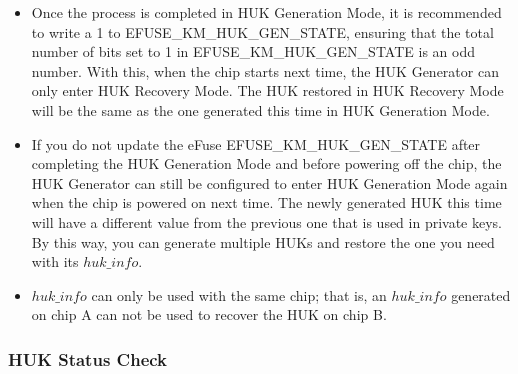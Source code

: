 \documentclass[main\_\_EN.tex]{subfiles}
\begin{document}
\vspace{-0.5em}
\begin{tiplisting}
\vspace{-2em}
\begin{itemize}
    \item Once the process is completed in HUK Generation Mode, it is recommended to write a 1 to EFUSE\_KM\_HUK\_GEN\_STATE, ensuring that the total number of bits set to 1 in EFUSE\_KM\_HUK\_GEN\_STATE is an odd number. With this, when the chip starts next time, the HUK Generator can only enter HUK Recovery Mode. The HUK restored in HUK Recovery Mode will be the same as the one generated this time in HUK Generation Mode.
    \item If you do not update the eFuse EFUSE\_KM\_HUK\_GEN\_STATE after completing the HUK Generation Mode and before powering off the chip, the HUK Generator can still be configured to enter HUK Generation Mode again when the chip is powered on next time. The newly generated HUK this time will have a different value from the previous one that is used in private keys. By this way, you can generate multiple HUKs and restore the one you need with its \hyperref[para:hukinfo]{\begin{math}huk\_info\end{math}}.
    \item \hyperref[para:hukinfo]{\begin{math}huk\_info\end{math}} can only be used with the same chip; that is, an \hyperref[para:hukinfo]{\begin{math}huk\_info\end{math}} generated on chip A can not be used to recover the HUK on chip B.
\end{itemize}
\end{tiplisting}

\subsubsection{HUK Status Check}
\end{document}

